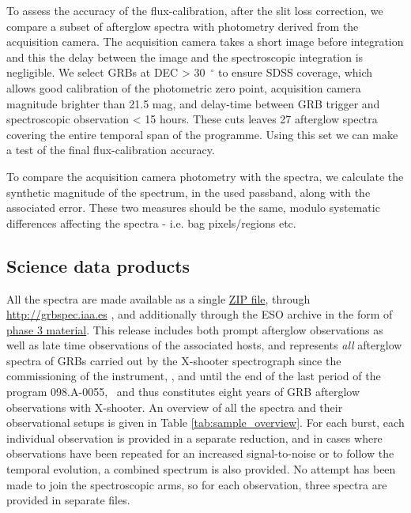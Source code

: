 \documentclass[longauth]{aa}    %
\begin{document}
To assess the accuracy of the flux-calibration, after the slit loss correction,
we compare a subset of afterglow spectra with photometry derived from the
acquisition camera. The acquisition camera takes a short image before
integration and this the delay between the image and the spectroscopic
integration is negligible. We select GRBs at DEC > 30~$^\circ$ to ensure
SDSS coverage, which allows good calibration of the photometric zero point,
acquisition camera magnitude brighter than 21.5 mag, and delay-time between GRB
trigger and spectroscopic observation < 15 hours. These cuts leaves 27
afterglow spectra covering the entire temporal span of the programme. Using this
set we can make a test of the final flux-calibration accuracy. 

To compare the acquisition camera photometry with the spectra, we calculate the
synthetic magnitude of the spectrum, in the used passband, along with the
associated error. These two measures should be the same, modulo systematic
differences affecting the spectra - i.e. bag pixels/regions etc. 


\subsection{Science data products} \label{products}


All the spectra are made available as a single
\href{https://sid.erda.dk/cgi-sid/ls.py?share_id=DBuNORk1lI}{ZIP file}, through
\url{http://grbspec.iaa.es} \citep{DeUgartePostigo2014f}, and additionally through the ESO archive in the
form of \href{http://archive.eso.org/wdb/wdb/adp/phase3_main/form}{phase 3
	material}. This release includes both prompt afterglow observations as well as
late time observations of the associated hosts, and represents \textit{all}
afterglow spectra of GRBs carried out by the X-shooter spectrograph since the
commissioning of the instrument, \startdate, and until the end of the last
period of the program 098.A-0055, \termdate~and thus constitutes eight years of GRB
afterglow observations with X-shooter. An overview of all the spectra and their
observational setups is given in Table \ref{tab:sample_overview}. For each
burst, each individual observation is provided in a separate reduction, and in
cases where observations have been repeated for an increased signal-to-noise or
to follow the temporal evolution, a combined spectrum is also provided. No
attempt has been made to join the spectroscopic arms, so for each observation,
three spectra are provided in separate files.
\end{document}

